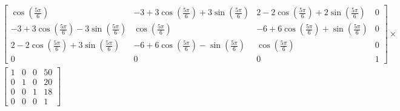 \documentclass[a4paper,12pt]{article}
\begin{document}
\begin{enumerate}
\begin{align*}
        &\begin{bmatrix}
            \cos(\frac{5\pi}{6}) &
            -3 + 3\cos(\frac{5\pi}{6}) + 3\sin(\frac{5\pi}{6}) &
            2 - 2\cos(\frac{5\pi}{6}) + 2\sin(\frac{5\pi}{6}) &
            0 \\
            -3 + 3\cos(\frac{5\pi}{6}) - 3\sin(\frac{5\pi}{6}) &
            \cos(\frac{5\pi}{6}) &
            -6 +6\cos(\frac{5\pi}{6}) + \sin(\frac{5\pi}{6})  &
            0 \\
            2 - 2\cos(\frac{5\pi}{6}) + 3\sin(\frac{5\pi}{6})  &
            -6 + 6\cos(\frac{5\pi}{6}) - \sin(\frac{5\pi}{6})  &
            \cos(\frac{5\pi}{6})                            &
            0 \\
            0 & 0 & 0 & 1
        \end{bmatrix}
        \times \\
        &\begin{bmatrix}
            1 & 0 & 0 & 50 \\
            0 & 1 & 0 & 20 \\
            0 & 0 & 1 & 18 \\
            0 & 0 & 0 & 1
        \end{bmatrix}
    \end{align*}
\end{enumerate}
\end{document}
